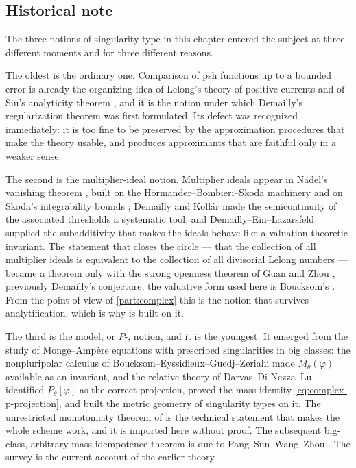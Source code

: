 \subsection{Historical note}
\label{sec:ch51-history}

The three notions of singularity type in this chapter entered the subject
at three different moments and for three different reasons.

The oldest is the ordinary one.  Comparison of psh functions up to a
bounded error is already the organizing idea of Lelong's theory of
positive currents \cite{Lel68} and of Siu's analyticity theorem
\cite{Siu74}, and it is the notion under which Demailly's regularization
theorem \cite{Dem92reg} was first formulated.  Its defect was recognized
immediately: it is too fine to be preserved by the approximation
procedures that make the theory usable, and
 produces approximants that are
faithful only in a weaker sense.

The second is the multiplier-ideal notion.  Multiplier ideals appear in
Nadel's vanishing theorem \cite{Nad89,Nad90}, built on the
H\"ormander--Bombieri--Skoda machinery and on Skoda's integrability
bounds \cite{Sko72}; Demailly and Kollár \cite{DK01} made the
semicontinuity of the associated thresholds a systematic tool, and
Demailly--Ein--Lazarsfeld \cite{DEL00} supplied the subadditivity that
makes the ideals behave like a valuation-theoretic invariant.  The
statement that closes the circle --- that the collection of all
multiplier ideals is equivalent to the collection of all divisorial
Lelong numbers --- became a theorem only with the strong openness theorem
of Guan and Zhou \cite{GZ15}, previously Demailly's conjecture; the
valuative form used here is Boucksom's \cite{Bou17}.  From the point of
view of \cref{part:complex} this is the notion that survives
analytification, which is why  is
built on it.

The third is the model, or \(P\)-, notion, and it is the youngest.  It
emerged from the study of Monge--Amp\`ere equations with prescribed
singularities in big classes: the nonpluripolar calculus of
Boucksom--Eyssidieux--Guedj--Zeriahi \cite{BEGZ10} made
\(M_\theta(\varphi)\) available as an invariant, and the relative theory
of Darvas--Di Nezza--Lu \cite{DDNL18mono,DDNL18big,DDNL18fullmass,%
DDNL19log,DDNLmetric} identified \(P_\theta[\varphi]\) as the correct
projection, proved the mass identity \eqref{eq:complex-p-projection}, and
built the metric geometry of singularity types on it.  The unrestricted
monotonicity theorem of \cite{DDNL18mono} is the technical statement that
makes the whole scheme work, and it is imported here without proof.  The
subsequent big-class, arbitrary-mass idempotence theorem is due to
Pang--Sun--Wang--Zhou \cite{PSWZ26}.  The survey \cite{DDNLsurv} is the
current account of the earlier theory.

